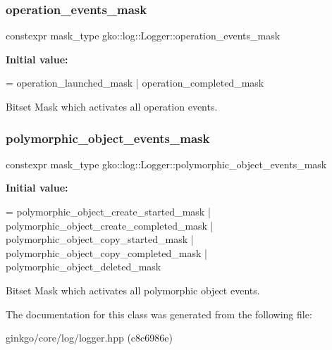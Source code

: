 \mbox{\label{classgko_1_1log_1_1Logger_a179f3d3ac86782922cbc63e33272840a}} 
\subsubsection{\texorpdfstring{operation\+\_\+events\+\_\+mask}{operation\_events\_mask}}
{\footnotesize\ttfamily constexpr mask\+\_\+type gko\+::log\+::\+Logger\+::operation\+\_\+events\+\_\+mask\hspace{0.3cm}{\ttfamily [static]}}

{\bfseries Initial value\+:}
\begin{DoxyCode}
=
        operation\_launched\_mask | operation\_completed\_mask
\end{DoxyCode}


Bitset Mask which activates all operation events. 

\mbox{\label{classgko_1_1log_1_1Logger_a5fb997f1c06c0602103d8dab616a96bc}} 
\subsubsection{\texorpdfstring{polymorphic\+\_\+object\+\_\+events\+\_\+mask}{polymorphic\_object\_events\_mask}}
{\footnotesize\ttfamily constexpr mask\+\_\+type gko\+::log\+::\+Logger\+::polymorphic\+\_\+object\+\_\+events\+\_\+mask\hspace{0.3cm}{\ttfamily [static]}}

{\bfseries Initial value\+:}
\begin{DoxyCode}
=
        polymorphic\_object\_create\_started\_mask |
        polymorphic\_object\_create\_completed\_mask |
        polymorphic\_object\_copy\_started\_mask |
        polymorphic\_object\_copy\_completed\_mask |
        polymorphic\_object\_deleted\_mask
\end{DoxyCode}


Bitset Mask which activates all polymorphic object events. 



The documentation for this class was generated from the following file\+:\begin{DoxyCompactItemize}
\item 
ginkgo/core/log/logger.\+hpp (c8c6986e)\end{DoxyCompactItemize}
